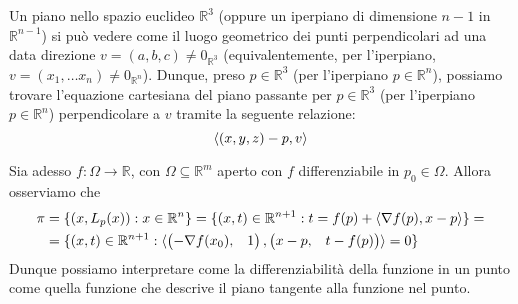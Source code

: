 \begin{definition}
Un piano nello spazio euclideo $\mathbb{R}^3$ (oppure un iperpiano di dimensione $n-1$ in $\mathbb{R}^{n-1}$) si può vedere come il luogo geometrico dei punti perpendicolari ad una data direzione $v = (a, b, c) \neq 0_{\mathbb{R}^3}$ (equivalentemente, per l'iperpiano, $v=(x_1, \ldots x_n) \neq 0_{\mathbb{R}^n}$). Dunque, preso $p \in \mathbb{R}^3$ (per l'iperpiano $p \in \mathbb{R}^n$), possiamo trovare l'equazione cartesiana del piano passante per $p \in \mathbb{R}^3$ (per l'iperpiano $p \in \mathbb{R}^n$) perpendicolare a $v$ tramite la seguente relazione:
\begin{equation}
\langle (x, y, z) - p, v \rangle
\end{equation}
\label{def:iperpiano}
\end{definition}
Sia adesso $f: \Omega \to \mathbb{R}$, con $\Omega \subseteq \mathbb{R}^m$ aperto con $f$ differenziabile in $p_0 \in \Omega$. Allora osserviamo che
\begin{align*}
\pi &= \{ (x, L_p(x)) : x \in \mathbb{R}^n \} = \{ (x, t) \in \mathbb{R}^{n+1} : t = f(p) + \langle \nabla{f(p)}, x-p \rangle \} = \\
&= \{ (x, t) \in \mathbb{R}^{n+1} : \langle \begin{pmatrix} -\nabla{f(x_0)}, & 1 \end{pmatrix}, \begin{pmatrix} x-p, & t-f(p) \end{pmatrix} \rangle = 0 \}
\end{align*}
Dunque possiamo interpretare come la differenziabilità della funzione in un punto come quella funzione che descrive il piano tangente alla funzione nel punto.

